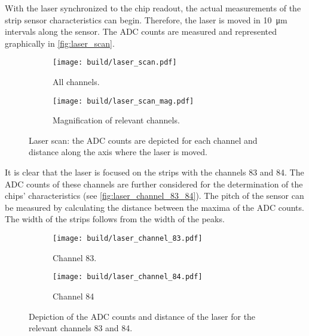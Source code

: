 With the laser synchronized to the chip readout, the actual measurements of the strip sensor characteristics can begin. Therefore, the laser is moved 
in \qty{10}{\micro\metre} intervals along the sensor. The ADC counts are measured and represented graphically in \autoref{fig:laser_scan}.
\begin{figure}
    \centering
    \begin{subfigure}{0.49\textwidth}
        \texttt{[image: build/laser\_scan.pdf]}
        \caption{All channels.}
        \label{fig:laser_scan_all_channels}
    \end{subfigure}
    \hfill
    \begin{subfigure}{0.49\textwidth}
        \texttt{[image: build/laser\_scan\_mag.pdf]}
        \caption{Magnification of relevant channels.}
        \label{fig:laser_scan_mag}
    \end{subfigure}
    \caption{Laser scan: the ADC counts are depicted for each channel and distance along the axis where the laser is moved.}
    \label{fig:laser_scan}
\end{figure}

It is clear that the laser is focused on the strips with the channels 83 and 84. The ADC counts of these channels are further considered for the determination of 
the chips' characteristics (see \autoref{fig:laser_channel_83_84}). The pitch of the sensor can be measured by calculating the distance between the maxima of the ADC counts. The width of the strips follows
from the width of the peaks. 
\begin{figure}
    \centering
    \begin{subfigure}{0.49\textwidth}
        \texttt{[image: build/laser\_channel\_83.pdf]}
        \caption{Channel 83.}
        \label{fig:laser_channel_83}
    \end{subfigure}
    \hfill
    \begin{subfigure}{0.49\textwidth}
        \texttt{[image: build/laser\_channel\_84.pdf]}
        \caption{Channel 84}
        \label{fig:laser_channel_84}
    \end{subfigure}
    \caption{Depiction of the ADC counts and distance of the laser for the relevant channels 83 and 84.}
    \label{fig:laser_channel_83_84}
\end{figure}

